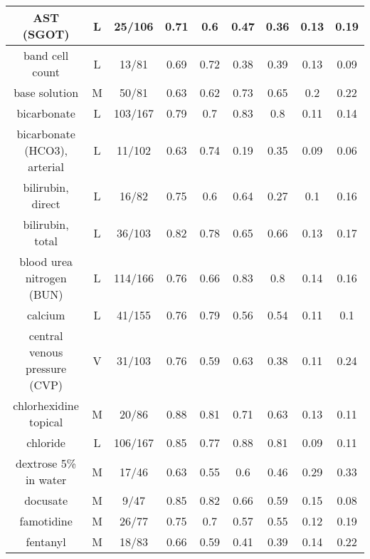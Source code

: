 \begin{scriptsize}
\begin{center}
\begin{longtable}{|ccc|c|c|c|c|c|c|}
\midrule
\multicolumn{1}{|c|}{AST (SGOT)} & \multicolumn{1}{c|}{L} & 25/106 & 0.71  & 0.6   & 0.47  & 0.36  & 0.13  & 0.19 \\
\midrule
\multicolumn{1}{|c|}{band cell count} & \multicolumn{1}{c|}{L} & 13/81 & 0.69  & 0.72  & 0.38  & 0.39  & 0.13  & 0.09 \\
\midrule
\multicolumn{1}{|c|}{base solution} & \multicolumn{1}{c|}{M} & 50/81 & 0.63  & 0.62  & 0.73  & 0.65  & 0.2   & 0.22 \\
\midrule
\multicolumn{1}{|c|}{bicarbonate} & \multicolumn{1}{c|}{L} & 103/167 & 0.79  & 0.7   & 0.83  & 0.8   & 0.11  & 0.14 \\
\midrule
\multicolumn{1}{|c|}{bicarbonate (HCO3), arterial} & \multicolumn{1}{c|}{L} & 11/102 & 0.63  & 0.74  & 0.19  & 0.35  & 0.09  & 0.06 \\
\midrule
\multicolumn{1}{|c|}{bilirubin, direct} & \multicolumn{1}{c|}{L} & 16/82 & 0.75  & 0.6   & 0.64  & 0.27  & 0.1   & 0.16 \\
\midrule
\multicolumn{1}{|c|}{bilirubin, total} & \multicolumn{1}{c|}{L} & 36/103 & 0.82  & 0.78  & 0.65  & 0.66  & 0.13  & 0.17 \\
\midrule
\multicolumn{1}{|c|}{blood urea nitrogen (BUN)} & \multicolumn{1}{c|}{L} & 114/166 & 0.76  & 0.66  & 0.83  & 0.8   & 0.14  & 0.16 \\
\midrule
\multicolumn{1}{|c|}{calcium} & \multicolumn{1}{c|}{L} & 41/155 & 0.76  & 0.79  & 0.56  & 0.54  & 0.11  & 0.1 \\
\midrule
\multicolumn{1}{|c|}{central venous pressure (CVP)} & \multicolumn{1}{c|}{V} & 31/103 & 0.76  & 0.59  & 0.63  & 0.38  & 0.11  & 0.24 \\
\midrule
\multicolumn{1}{|c|}{chlorhexidine topical} & \multicolumn{1}{c|}{M} & 20/86 & 0.88  & 0.81  & 0.71  & 0.63  & 0.13  & 0.11 \\
\midrule
\multicolumn{1}{|c|}{chloride} & \multicolumn{1}{c|}{L} & 106/167 & 0.85  & 0.77  & 0.88  & 0.81  & 0.09  & 0.11 \\
\midrule
\multicolumn{1}{|c|}{dextrose 5\% in water} & \multicolumn{1}{c|}{M} & 17/46 & 0.63  & 0.55  & 0.6   & 0.46  & 0.29  & 0.33 \\
\midrule
\multicolumn{1}{|c|}{docusate} & \multicolumn{1}{c|}{M} & 9/47 & 0.85  & 0.82  & 0.66  & 0.59  & 0.15  & 0.08 \\
\midrule
\multicolumn{1}{|c|}{famotidine} & \multicolumn{1}{c|}{M} & 26/77 & 0.75  & 0.7   & 0.57  & 0.55  & 0.12  & 0.19 \\
\midrule
\multicolumn{1}{|c|}{fentanyl} & \multicolumn{1}{c|}{M} & 18/83 & 0.66  & 0.59  & 0.41  & 0.39  & 0.14  & 0.22 \\

\end{longtable}
\end{center}
\end{scriptsize}
